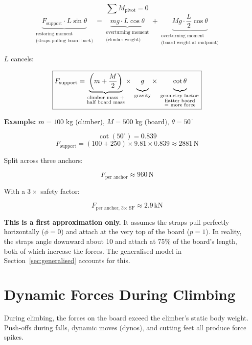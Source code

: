 \documentclass[12pt]{article}
\begin{document}
\[
\sum M_{\text{pivot}} = 0
\]
\[
\underbrace{F_{\text{support}} \cdot L \sin\theta}_{\substack{\text{restoring moment}\\\text{(straps pulling board back)}}}
=
\underbrace{m g \cdot L \cos\theta}_{\substack{\text{overturning moment}\\\text{(climber weight)}}}
+
\underbrace{M g \cdot \frac{L}{2} \cos\theta}_{\substack{\text{overturning moment}\\\text{(board weight at midpoint)}}}
\]

$L$ cancels:

\[
\boxed{F_{\text{support}} =
\underbrace{\left(m + \frac{M}{2}\right)}_{\substack{\text{climber mass +}\\\text{half board mass}}}
\times\;
\underbrace{g\vphantom{\frac{M}{2}}}_{\text{gravity}}
\times\;
\underbrace{\cot\theta\vphantom{\frac{M}{2}}}_{\substack{\text{geometry factor:}\\\text{flatter board}\\\text{= more force}}}
}
\]

\vspace{0.5em}
\textbf{Example:} $m = 100$ kg (climber), $M = 500$ kg (board), $\theta = 50^\circ$

\[
\cot(50^\circ) = 0.839
\]
\[
F_{\text{support}} = \left(100 + 250\right) \times 9.81 \times 0.839 \approx 2881\,\text{N}
\]

Split across three anchors:

\[
F_{\text{per anchor}} \approx 960\,\text{N}
\]

With a $3\times$ safety factor:

\[
F_{\text{per anchor, 3$\times$ SF}} \approx 2.9\,\text{kN}
\]

\textbf{This is a first approximation only.} It assumes the straps pull perfectly horizontally ($\phi = 0$) and attach at the very top of the board ($p = 1$). In reality, the straps angle downward about 10\textdegree{} and attach at 75\% of the board's length, both of which increase the forces. The generalised model in Section~\ref{sec:generalised} accounts for this.


\section{Dynamic Forces During Climbing}
\label{sec:fall_impact}
During climbing, the forces on the board exceed the climber's static body weight. Push-offs during falls, dynamic moves (dynos), and cutting feet all produce force spikes.
\end{document}
